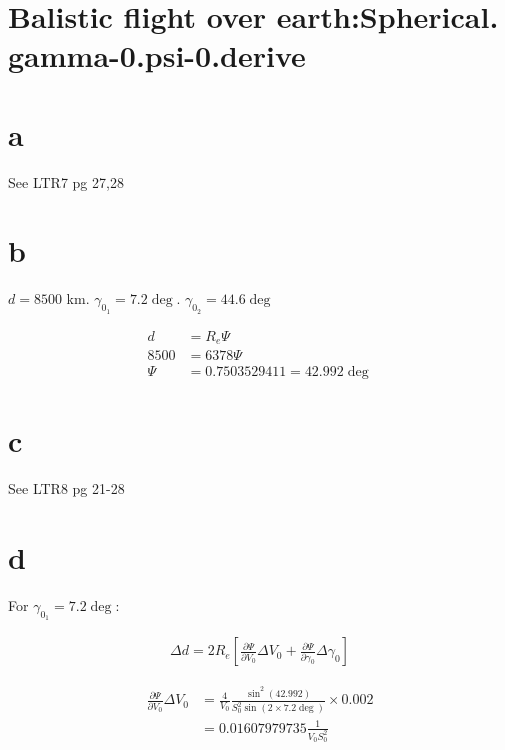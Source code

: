 \section{ Balistic flight over earth:Spherical. gamma-0.psi-0.derive }\label{sec:q4}    

\section*{a}

See LTR7 pg 27,28

\section*{b}

$d = 8500$ km. $\gamma_0_1 = 7.2\deg$. $\gamma_0_2 = 44.6\deg$

\begin{equation}
\begin{split}
    d &= R_e \Psi \\
    8500 &= 6378 \Psi \\
    \Psi &= 0.7503529411 = 42.992 \deg
\end{split}
\end{equation}

\section*{c}

See LTR8 pg 21-28

\section*{d}

For $\gamma_0_1 = 7.2\deg$:

\begin{equation}
    \begin{split}
        \Delta d = 2 R_e [\frac{\partial \Psi }{\partial V_0} \Delta V_0 + \frac{\partial \Psi}{\partial \gamma_0} \Delta \gamma_0] 
    \end{split}
\end{equation}

\begin{equation}
    \begin{split}
        \frac{\partial \Psi }{\partial V_0} \Delta V_0 &= \frac{4}{V_0} \frac{\sin^2(42.992)}{S_0^2 \sin(2\times 7.2 \deg)} \times 0.002\\
        &= 0.01607979735 \frac{1}{V_0 S_0^2}
    \end{split}
\end{equation}

